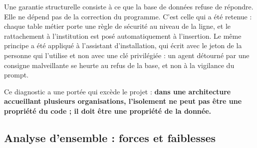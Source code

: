 Une garantie structurelle consiste à ce que la base de données refuse de
répondre. Elle ne dépend pas de la correction du programme. C'est celle qui a
été retenue : chaque table métier porte une règle de sécurité au niveau de la
ligne, et le rattachement à l'institution est posé automatiquement à
l'insertion. Le même principe a été appliqué à l'assistant d'installation, qui
écrit avec le jeton de la personne qui l'utilise et non avec une clé
privilégiée : un agent détourné par une consigne malveillante se heurte au refus
de la base, et non à la vigilance du prompt.

Ce diagnostic a une portée qui excède le projet : \textbf{dans une architecture
accueillant plusieurs organisations, l'isolement ne peut pas être une propriété
du code ; il doit être une propriété de la donnée.}

\subsection{Analyse d'ensemble : forces et faiblesses}

